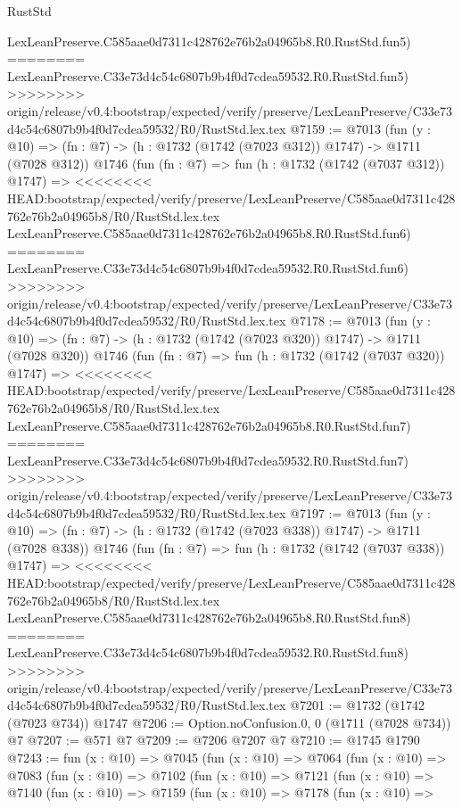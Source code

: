 \begin{lexlean}{RustStd}
\begin{coremodule}
{\begin{coremodule}
{{{{{{{{{{{{{    LexLeanPreserve.C585aae0d7311c428762e76b2a04965b8.R0.RustStd.fun5)
========
    LexLeanPreserve.C33e73d4c54c6807b9b4f0d7cdea59532.R0.RustStd.fun5)
>>>>>>>> origin/release/v0.4:bootstrap/expected/verify/preserve/LexLeanPreserve/C33e73d4c54c6807b9b4f0d7cdea59532/R0/RustStd.lex.tex
@7159 := @7013
    (fun (y : @10) => (fn : @7) -> (h : @1732 (@1742 (@7023 @312)) @1747) -> @1711 (@7028 @312))
    @1746
    (fun (fn : @7) =>
    fun (h : @1732 (@1742 (@7037 @312)) @1747) =>
<<<<<<<< HEAD:bootstrap/expected/verify/preserve/LexLeanPreserve/C585aae0d7311c428762e76b2a04965b8/R0/RustStd.lex.tex
    LexLeanPreserve.C585aae0d7311c428762e76b2a04965b8.R0.RustStd.fun6)
========
    LexLeanPreserve.C33e73d4c54c6807b9b4f0d7cdea59532.R0.RustStd.fun6)
>>>>>>>> origin/release/v0.4:bootstrap/expected/verify/preserve/LexLeanPreserve/C33e73d4c54c6807b9b4f0d7cdea59532/R0/RustStd.lex.tex
@7178 := @7013
    (fun (y : @10) => (fn : @7) -> (h : @1732 (@1742 (@7023 @320)) @1747) -> @1711 (@7028 @320))
    @1746
    (fun (fn : @7) =>
    fun (h : @1732 (@1742 (@7037 @320)) @1747) =>
<<<<<<<< HEAD:bootstrap/expected/verify/preserve/LexLeanPreserve/C585aae0d7311c428762e76b2a04965b8/R0/RustStd.lex.tex
    LexLeanPreserve.C585aae0d7311c428762e76b2a04965b8.R0.RustStd.fun7)
========
    LexLeanPreserve.C33e73d4c54c6807b9b4f0d7cdea59532.R0.RustStd.fun7)
>>>>>>>> origin/release/v0.4:bootstrap/expected/verify/preserve/LexLeanPreserve/C33e73d4c54c6807b9b4f0d7cdea59532/R0/RustStd.lex.tex
@7197 := @7013
    (fun (y : @10) => (fn : @7) -> (h : @1732 (@1742 (@7023 @338)) @1747) -> @1711 (@7028 @338))
    @1746
    (fun (fn : @7) =>
    fun (h : @1732 (@1742 (@7037 @338)) @1747) =>
<<<<<<<< HEAD:bootstrap/expected/verify/preserve/LexLeanPreserve/C585aae0d7311c428762e76b2a04965b8/R0/RustStd.lex.tex
    LexLeanPreserve.C585aae0d7311c428762e76b2a04965b8.R0.RustStd.fun8)
========
    LexLeanPreserve.C33e73d4c54c6807b9b4f0d7cdea59532.R0.RustStd.fun8)
>>>>>>>> origin/release/v0.4:bootstrap/expected/verify/preserve/LexLeanPreserve/C33e73d4c54c6807b9b4f0d7cdea59532/R0/RustStd.lex.tex
@7201 := @1732 (@1742 (@7023 @734)) @1747
@7206 := Option.noConfusion.{0, 0} (@1711 (@7028 @734)) @7
@7207 := @571 @7
@7209 := @7206 @7207 @7
@7210 := @1745 @1790
@7243 := fun (x : @10) =>
  @7045
    (fun (x : @10) =>
    @7064
      (fun (x : @10) =>
      @7083
        (fun (x : @10) =>
        @7102
          (fun (x : @10) =>
          @7121
            (fun (x : @10) =>
            @7140
              (fun (x : @10) =>
              @7159
                (fun (x : @10) =>
                @7178
                  (fun (x : @10) =>
}}}}}}}}}}}}}
\end{coremodule}}
\end{coremodule}
\end{lexlean}
